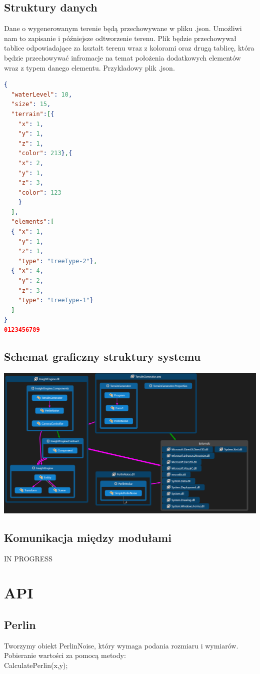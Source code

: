 \documentclass[12pt,a4paper]{article}
\begin{document}
\subsection{Struktury danych}
Dane o wygenerowanym terenie będą przechowywane w pliku .json. Umożliwi nam to zapisanie i późniejsze odtworzenie terenu. Plik będzie przechowywał tablice odpowiadające za kształt terenu wraz z kolorami oraz drugą tablicę, która będzie przechowywać infromacje na temat położenia dodatkowych elementów wraz z typem danego elementu. Przykladowy plik .json.
\begin{lstlisting}[language=json,firstnumber=1]
{
  "waterLevel": 10,
  "size": 15,
  "terrain":[{
	"x": 1,
	"y": 1,
	"z": 1,
	"color": 213},{
	"x": 2,
	"y": 1,
	"z": 3,
	"color": 123
	}
  ],
  "elements":[
  { "x": 1,
	"y": 1,
	"z": 1,
	"type": "treeType-2"},
  { "x": 4,
	"y": 2,
	"z": 3,
	"type": "treeType-1"}
  ]
}
0123456789
\end{lstlisting}
\subsection{Schemat graficzny struktury systemu}
\includegraphics[width=1\textwidth]{images/klasy.png}
\subsection{Komunikacja między modułami}
IN PROGRESS
\section{API}
\subsection{Perlin}
Tworzymy obiekt PerlinNoise, który wymaga podania rozmiaru i wymiarów.
Pobieranie wartości za pomocą metody:\\
CalculatePerlin(x,y);
\end{document}
